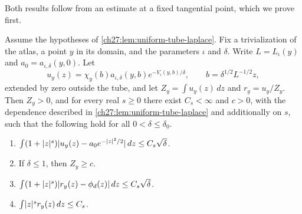 Both results follow from an estimate at a fixed tangential point, which we prove first.

\begin{lemma}\label{ch27:lem:pointwise-laplace}
Assume the hypotheses of \cref{ch27:lem:uniform-tube-laplace}. Fix a trivialization of the atlas, a point $y$ in its domain, and the parameters $\iota$ and $\delta$. Write $L=L_\iota(y)$ and $a_0=a_{\iota,\delta}(y,0)$. Let
\[
 u_y(z)=\chi_y(b)a_{\iota,\delta}(y,b)e^{-V_\iota(y,b)/\delta},\qquad b=\delta^{1/2}L^{-1/2}z,
\]
extended by zero outside the tube, and let $Z_y=\int u_y(z)\,dz$ and $r_y=u_y/Z_y$. Then $Z_y>0$, and for every real $s\ge0$ there exist $C_s<\infty$ and $c>0$, with the dependence described in \cref{ch27:lem:uniform-tube-laplace} and additionally on $s$, such that the following hold for all $0<\delta\le\delta_0$.
\begin{enumerate}
\item $\int(1+\lvert z\rvert^s)\lvert u_y(z)-a_0e^{-\lvert z\rvert^2/2}\rvert\,dz\le C_s\sqrt\delta$.
\item If $\delta\le1$, then $Z_y\ge c$.
\item $\int(1+\lvert z\rvert^s)\lvert r_y(z)-\phi_d(z)\rvert\,dz\le C_s\sqrt\delta$.
\item $\int\lvert z\rvert^sr_y(z)\,dz\le C_s$.
\end{enumerate}
\end{lemma}

